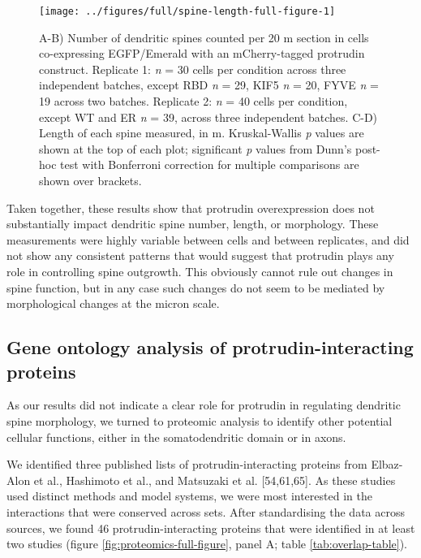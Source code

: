 \documentclass[
  12pt,
  a4paper,
]{book}
\begin{document}
\begin{figure}
\texttt{[image: ../figures/full/spine-length-full-figure-1]} \caption[Protrudin effect on dendritic spine length]{A-B) Number of dendritic spines counted per 20 \textmu{}m section in cells co-expressing EGFP/Emerald with an mCherry-tagged protrudin construct. Replicate 1: \emph{n} = 30 cells per condition across three independent batches, except \textDelta{}RBD \emph{n} = 29, \textDelta{}KIF5 \emph{n} = 20, \textDelta{}FYVE \emph{n} = 19 across two batches. Replicate 2: \emph{n} = 40 cells per condition, except WT and \textDelta{}ER \emph{n} = 39, across three independent batches. C-D) Length of each spine measured, in \textmu{}m. Kruskal-Wallis \emph{p} values are shown at the top of each plot; significant \emph{p} values from Dunn's post-hoc test with Bonferroni correction for multiple comparisons are shown over brackets.}\label{fig:spine-length-full-figure}
\end{figure}

Taken together, these results show that protrudin overexpression does not substantially impact dendritic spine number, length, or morphology. These measurements were highly variable between cells and between replicates, and did not show any consistent patterns that would suggest that protrudin plays any role in controlling spine outgrowth. This obviously cannot rule out changes in spine function, but in any case such changes do not seem to be mediated by morphological changes at the micron scale.

\subsection{Gene ontology analysis of protrudin-interacting proteins}\label{GO-analysis}

As our results did not indicate a clear role for protrudin in regulating dendritic spine morphology, we turned to proteomic analysis to identify other potential cellular functions, either in the somatodendritic domain or in axons.

We identified three published lists of protrudin-interacting proteins from Elbaz-Alon et al., Hashimoto et al., and Matsuzaki et al. {[}54,61,65{]}. As these studies used distinct methods and model systems, we were most interested in the interactions that were conserved across sets. After standardising the data across sources, we found 46 protrudin-interacting proteins that were identified in at least two studies (figure \ref{fig:proteomics-full-figure}, panel A; table \ref{tab:overlap-table}).
\end{document}

